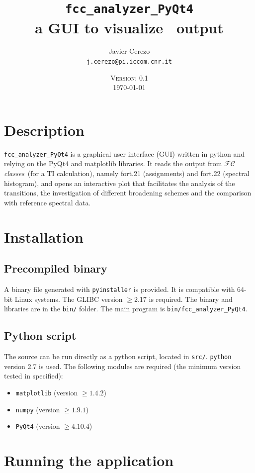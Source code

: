 \documentclass[a4paper,11pt]{article}
\title{\texttt{fcc\_analyzer\_PyQt4}\\ a GUI to visualize \fcc\ output}
\date{\textsc{Version: 0.1}\\\today}
\author{Javier Cerezo\\\texttt{j.cerezo@pi.iccom.cnr.it}}
\begin{document}
\setlength{\parskip}{0.5em}
\newcommand{\fcc}{$\mathcal{FC}$\textit{classes}}

\maketitle

\section{Description}
\texttt{fcc\_analyzer\_PyQt4} is a graphical user interface (GUI) written in python and relying on the PyQt4 and matplotlib libraries. It reads the output from \fcc\ (for a TI calculation), namely fort.21 (assignments) and fort.22 (spectral histogram), and opens an interactive plot that facilitates the analysis of the transitions, the investigation of different broadening schemes and the comparison with reference spectral data.

\section{Installation}

\subsection{Precompiled binary}
A binary file generated with \texttt{pyinstaller} is provided. It is compatible with 64-bit Linux systems. The GLIBC version $\geq$2.17 is required. The binary and libraries are in the \texttt{bin/} folder. The main program is \texttt{bin/fcc\_analyzer\_PyQt4}.

\subsection{Python script}
The source can be run directly as a python script, located in \texttt{src/}. \texttt{python} version 2.7 is used. The following modules are required (the minimum version tested in specified):

\begin{itemize}
 \item \texttt{matplotlib} (version $\geq1.4.2$)
 \item \texttt{numpy} (version $\geq1.9.1$)
 \item \texttt{PyQt4} (version $\geq4.10.4$)
\end{itemize}

\clearpage

\section{Running the application}
\end{document}
